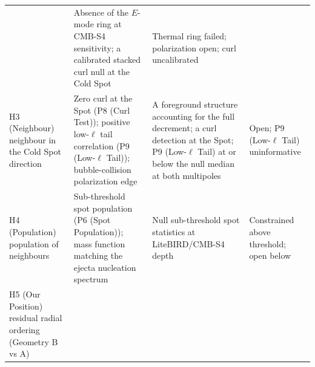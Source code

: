 \documentclass[
]{article}
\begin{document}
\begin{longtable}[]{@{}llll@{}}
\begin{minipage}[t]{0.22\columnwidth}
\end{minipage} & \begin{minipage}[t]{0.22\columnwidth}\raggedright
Absence of the \(E\)-mode ring at CMB-S4 sensitivity; a calibrated
stacked curl null at the Cold Spot\strut
\end{minipage} & \begin{minipage}[t]{0.22\columnwidth}\raggedright
Thermal ring failed; polarization open; curl uncalibrated\strut
\end{minipage}\tabularnewline
\begin{minipage}[t]{0.22\columnwidth}\raggedright
H3 (Neighbour) neighbour in the Cold Spot direction\strut
\end{minipage} & \begin{minipage}[t]{0.22\columnwidth}\raggedright
Zero curl at the Spot (P8 (Curl Test)); positive low-\(\ell\) tail
correlation (P9 (Low-\(\ell\) Tail)); bubble-collision polarization
edge\strut
\end{minipage} & \begin{minipage}[t]{0.22\columnwidth}\raggedright
A foreground structure accounting for the full decrement; a curl
detection at the Spot; P9 (Low-\(\ell\) Tail) at or below the null
median at both multipoles\strut
\end{minipage} & \begin{minipage}[t]{0.22\columnwidth}\raggedright
Open; P9 (Low-\(\ell\) Tail) uninformative\strut
\end{minipage}\tabularnewline
\begin{minipage}[t]{0.22\columnwidth}\raggedright
H4 (Population) population of neighbours\strut
\end{minipage} & \begin{minipage}[t]{0.22\columnwidth}\raggedright
Sub-threshold spot population (P6 (Spot Population)); mass function
matching the ejecta nucleation spectrum\strut
\end{minipage} & \begin{minipage}[t]{0.22\columnwidth}\raggedright
Null sub-threshold spot statistics at LiteBIRD/CMB-S4 depth\strut
\end{minipage} & \begin{minipage}[t]{0.22\columnwidth}\raggedright
Constrained above threshold; open below\strut
\end{minipage}\tabularnewline
\begin{minipage}[t]{0.22\columnwidth}\raggedright
H5 (Our Position) residual radial ordering (Geometry B vs A)\strut
\end{minipage} & \begin{minipage}[t]{0.22\columnwidth}\raggedright

\end{minipage}
\end{longtable}
\end{document}
